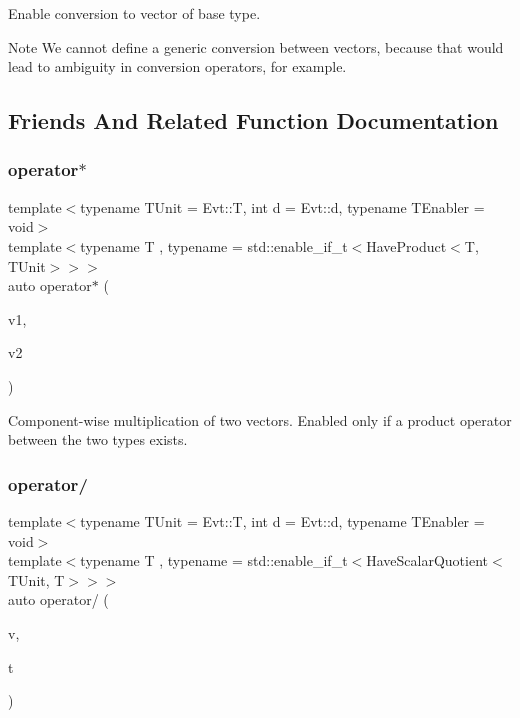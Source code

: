 Enable conversion to vector of base type. \begin{DoxyNote}{Note}
We cannot define a generic conversion between vectors, because that would lead to ambiguity in conversion operators, for example. 
\end{DoxyNote}


\subsection{Friends And Related Function Documentation}
\hypertarget{classVector_ae0327ce67bfbacc8e20970e5fe0319d6}{}\label{classVector_ae0327ce67bfbacc8e20970e5fe0319d6} 
\subsubsection{\texorpdfstring{operator$\ast$}{operator*}}
{\footnotesize\ttfamily template$<$typename T\+Unit = Evt\+::T, int d = Evt\+::d, typename T\+Enabler = void$>$ \\
template$<$typename T , typename  = std\+::enable\+\_\+if\+\_\+t$<$\+Have\+Product$<$\+T, T\+Unit$>$$>$$>$ \\
auto operator$\ast$ (\begin{DoxyParamCaption}\item[{const \hyperlink{classVector}{Vector}$<$ T\+Unit, d, T\+Enabler $>$ \&}]{v1,  }\item[{const \hyperlink{classVector}{Vector}$<$ T, d $>$ \&}]{v2 }\end{DoxyParamCaption})\hspace{0.3cm}{\ttfamily [friend]}}

Component-\/wise multiplication of two vectors. Enabled only if a product operator between the two types exists. \hypertarget{classVector_a6da5d490ff6380328266f2b24a2d85e7}{}\label{classVector_a6da5d490ff6380328266f2b24a2d85e7} 
\subsubsection{\texorpdfstring{operator/}{operator/}\hspace{0.1cm}{\footnotesize\ttfamily [1/2]}}
{\footnotesize\ttfamily template$<$typename T\+Unit = Evt\+::T, int d = Evt\+::d, typename T\+Enabler = void$>$ \\
template$<$typename T , typename  = std\+::enable\+\_\+if\+\_\+t$<$\+Have\+Scalar\+Quotient$<$\+T\+Unit, T$>$$>$$>$ \\
auto operator/ (\begin{DoxyParamCaption}\item[{const \hyperlink{classVector}{Vector}$<$ T\+Unit, d, T\+Enabler $>$ \&}]{v,  }\item[{const T \&}]{t }\end{DoxyParamCaption})\hspace{0.3cm}{\ttfamily [friend]}}

